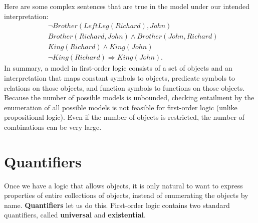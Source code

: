 Here are some complex sentences that are true in the model under our intended interpretation:
\[\begin{split}
    & \neg Brother (LeftLeg(Richard), John)\\
    & Brother (Richard, John) \land Brother (John, Richard)\\
    & King(Richard) \land King(John)\\
    & \neg King(Richard) \Rightarrow King(John) .
\end{split}\]
In summary, a model in first-order logic consists of a set of objects and an interpretation that maps constant symbols to objects, predicate symbols to relations on those objects, and function symbols to functions on those objects.\newline\newline
Because the number of possible models is unbounded, checking entailment by the enumeration of all possible models is not feasible for first-order logic (unlike propositional logic).  Even if the number of objects is restricted, the number of combinations can be very large.


\section{Quantifiers}
Once we have a logic that allows objects, it is only natural to want to express properties of entire collections of objects, instead of enumerating the objects by name. \textbf{Quantifiers} let us do this. First-order logic contains two standard quantifiers, called \textbf{universal} and \textbf{existential}.

